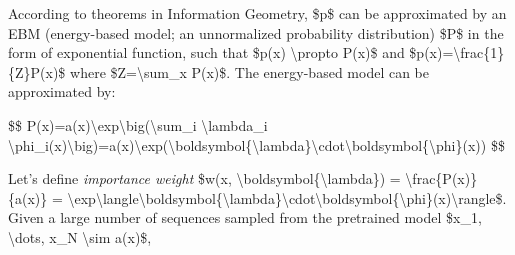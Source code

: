 According to theorems in Information Geometry, \$p\$ can be approximated by an EBM (energy-based model; an unnormalized probability distribution) \$P\$ in the form of exponential function, such that \$p(x) \textbackslash propto P(x)\$ and \$p(x)=\textbackslash frac\{1\}\{Z\}P(x)\$ where \$Z=\textbackslash sum\_x P(x)\$. The energy-based model can be approximated by:

\$\$ P(x)=a(x)\textbackslash exp\textbackslash big(\textbackslash sum\_i \textbackslash lambda\_i \textbackslash phi\_i(x)\textbackslash big)=a(x)\textbackslash exp(\textbackslash boldsymbol\{\textbackslash lambda\}\textbackslash cdot\textbackslash boldsymbol\{\textbackslash phi\}(x)) \$\$

Let's define \emph{importance weight} \$w(x, \textbackslash boldsymbol\{\textbackslash lambda\}) = \textbackslash frac\{P(x)\}\{a(x)\} = \textbackslash exp\textbackslash langle\textbackslash boldsymbol\{\textbackslash lambda\}\textbackslash cdot\textbackslash boldsymbol\{\textbackslash phi\}(x)\textbackslash rangle\$. Given a large number of sequences sampled from the pretrained model \$x\_1, \textbackslash dots, x\_N \textbackslash sim a(x)\$,

